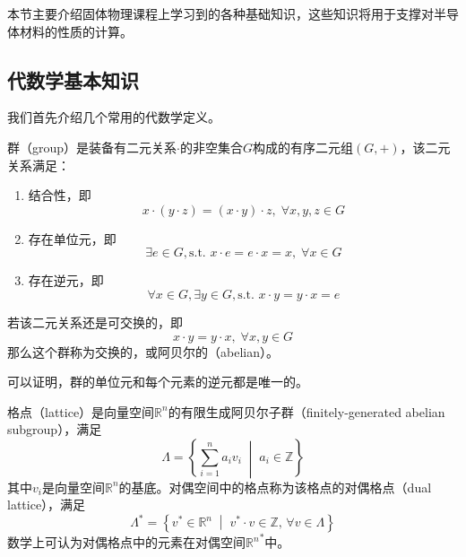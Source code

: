 
本节主要介绍固体物理课程上学习到的各种基础知识，这些知识将用于支撑对半导体材料的性质的计算。

\subsection{代数学基本知识}

我们首先介绍几个常用的代数学定义。

\begin{definition}
    群（group）是装备有二元关系$\cdot$的非空集合$G$构成的有序二元组$(G, +)$，该二元关系满足：
    \begin{enumerate}[nosep]
        \item 结合性，即
            \begin{equation}x\cdot ( y \cdot z) = (x \cdot y) \cdot z, \; \forall x,y,z \in G\end{equation}
        \item 存在单位元，即
            \begin{equation}\exists e \in G, \text{s.t. } x \cdot e = e\cdot x = x, \; \forall x \in G\end{equation}
        \item 存在逆元，即
            \begin{equation}\forall x \in G, \exists y \in G, \text{s.t. } x \cdot y = y \cdot x = e\end{equation}
    \end{enumerate}
    若该二元关系还是可交换的，即
    \begin{equation}x \cdot y = y \cdot x, \; \forall x, y \in G\end{equation}
    那么这个群称为交换的，或阿贝尔的（abelian）。
\end{definition}

可以证明，群的单位元和每个元素的逆元都是唯一的。

\begin{definition}
    格点（lattice）是向量空间$\mathbb R^n$的有限生成阿贝尔子群（finitely-generated abelian subgroup），满足
    \begin{equation}\Lambda = \left\{ \sum_{i=1}^n a_i v_i \; \middle\vert\; a_i \in \mathbb Z \right\}\end{equation}
    其中$v_i$是向量空间$\mathbb R^n$的基底。对偶空间中的格点称为该格点的对偶格点（dual lattice），满足
    \begin{equation}\Lambda^* = \left\{ v^* \in \mathbb R^n \; \middle\vert \; v^* \cdot v \in \mathbb Z ,\, \forall v \in \Lambda \right\}\end{equation}
    数学上可认为对偶格点中的元素在对偶空间${{\mathbb{R}}^n}^*$中。
\end{definition}

